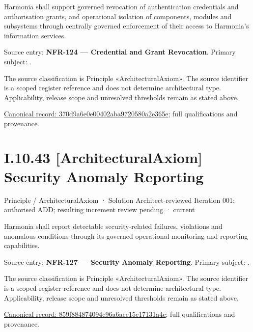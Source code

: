 Harmonia shall support governed revocation of authentication credentials and authorisation grants, and operational isolation of components, modules and subsystems through centrally governed enforcement of their access to Harmonia's information services.



Source entry: \textbf{NFR-124 — Credential and Grant Revocation}. Primary subject: \texttt{}.



The source classification is Principle «ArchitecturalAxiom». The source identifier is a scoped register reference and does not determine architectural type. Applicability, release scope and unresolved thresholds remain as stated above.


{\footnotesize \href{../../../../../../../continuum/motivation/principle/architectural-axiom/370d9a6e0e00402aba9720580a2e365e.md}{Canonical record: 370d9a6e0e00402aba9720580a2e365e}; full qualifications and provenance.}\par
\section*{I.10.43 [ArchitecturalAxiom] Security Anomaly Reporting}
\label{navigation:I.10.43}

\label{element:859f884874094c96a6ace15e17131a4c}
{\small Principle / ArchitecturalAxiom · Solution Architect-reviewed Iteration 001; authorised ADD; resulting increment review pending · current}\par

Harmonia shall report detectable security-related failures, violations and anomalous conditions through its governed operational monitoring and reporting capabilities.



Source entry: \textbf{NFR-127 — Security Anomaly Reporting}. Primary subject: \texttt{}.



The source classification is Principle «ArchitecturalAxiom». The source identifier is a scoped register reference and does not determine architectural type. Applicability, release scope and unresolved thresholds remain as stated above.


{\footnotesize \href{../../../../../../../continuum/motivation/principle/architectural-axiom/859f884874094c96a6ace15e17131a4c.md}{Canonical record: 859f884874094c96a6ace15e17131a4c}; full qualifications and provenance.}\par
